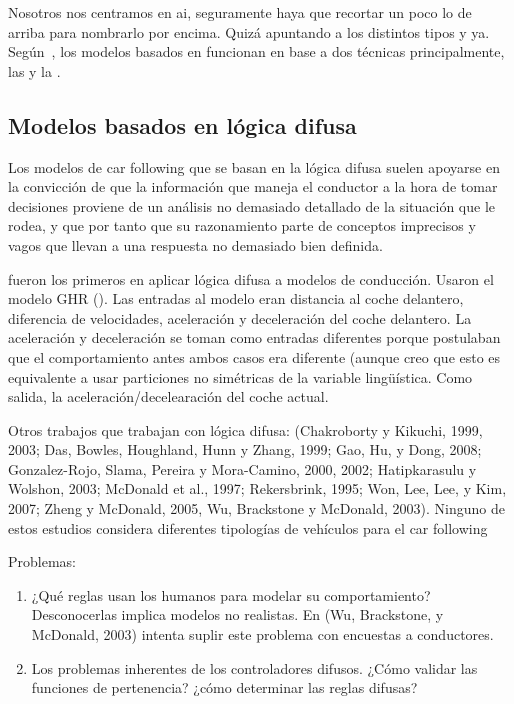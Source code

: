 Nosotros nos centramos en \acrshort{ai}, seguramente haya que recortar un poco lo de arriba para nombrarlo por encima. Quizá apuntando a los distintos tipos y ya. Según~\cite{Aghabayk2015}, los modelos basados en  funcionan en base a dos técnicas principalmente, las  y la .

\subsection{Modelos basados en lógica difusa}

Los modelos de car following que se basan en la lógica difusa suelen apoyarse en la convicción de que la información que maneja el conductor a la hora de tomar decisiones proviene de un análisis no demasiado detallado de la situación que le rodea, y que por tanto que su razonamiento parte de conceptos imprecisos y vagos que llevan a una respuesta no demasiado bien definida.

\cite{Kikuchi1992} fueron los primeros en aplicar lógica difusa a modelos de conducción. Usaron el modelo GHR (\cite{Chandler1958}). Las entradas al modelo eran distancia al coche delantero, diferencia de velocidades, aceleración y deceleración del coche delantero. La aceleración y deceleración se toman como entradas diferentes porque postulaban que el comportamiento antes ambos casos era diferente (aunque creo que esto es equivalente a usar particiones no simétricas de la variable lingüística. Como salida, la aceleración/decelearación del coche actual.

Otros trabajos que trabajan con lógica difusa: (Chakroborty y Kikuchi, 1999, 2003; Das, Bowles, Houghland, Hunn y Zhang, 1999; Gao, Hu, y Dong, 2008; Gonzalez-Rojo, Slama, Pereira y Mora-Camino, 2000, 2002; Hatipkarasulu y Wolshon, 2003; McDonald et al., 1997; Rekersbrink, 1995; Won, Lee, Lee, y Kim, 2007; Zheng y McDonald, 2005, Wu, Brackstone y McDonald, 2003). Ninguno de estos estudios considera diferentes tipologías de vehículos para el car following

Problemas:

\begin{enumerate}
	\item ¿Qué reglas usan los humanos para modelar su comportamiento? Desconocerlas implica modelos no realistas. En (Wu, Brackstone, y McDonald, 2003) intenta suplir este problema con encuestas a conductores.
	\item Los problemas inherentes de los controladores difusos. ¿Cómo validar las funciones de pertenencia? ¿cómo determinar las reglas difusas?
\end{enumerate}

